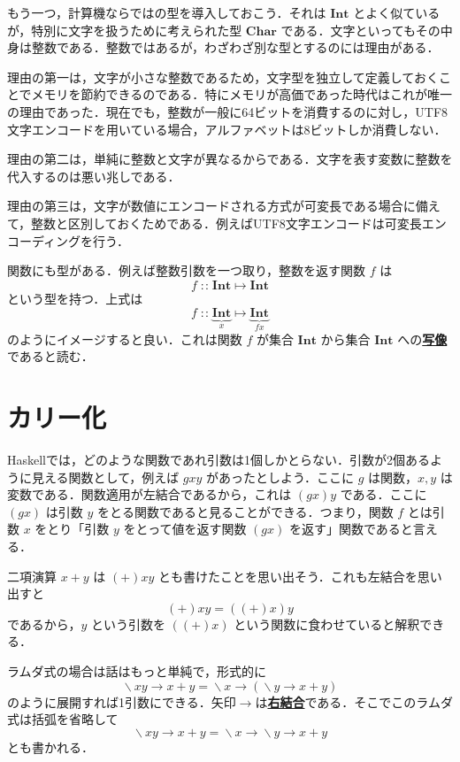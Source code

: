 \documentclass[a4paper,twocolumn]{jsbook}
\newcommand{\programminglanguage}[1]{\textsf{#1}}
\newcommand{\haskell}{\programminglanguage{Haskell}}
\newcommand{\keyword}[1]{{\underline{\textbf{#1}}}}
\DeclareMathOperator{\mIn}{{:\!:}}
\DeclareMathOperator{\mLambda}{\backslash}
\DeclareMathOperator{\mLambdaArrow}{\rightarrow}
\DeclareMathOperator{\mMapsTo}{\mapsto}
\newcommand{\mType}[1]{\mathbf{#1}}
\newcommand{\mCharType}{\mType{Char}}
\newcommand{\mIntType}{\mType{Int}}
\newcommand{\mLambdaExp}[2]{\mLambda{#1}\mLambdaArrow{#2}}
\newcommand{\mProj}[2]{#1\mMapsTo#2}
\begin{document}
もう一つ，計算機ならではの型を導入しておこう．それは $\mIntType$ とよく似ているが，特別に文字を扱うために考えられた型 $\mCharType$ である．文字といってもその中身は整数である．整数ではあるが，わざわざ別な型とするのには理由がある．

理由の第一は，文字が小さな整数であるため，文字型を独立して定義しておくことでメモリを節約できるのである．特にメモリが高価であった時代はこれが唯一の理由であった．現在でも，整数が一般に64ビットを消費するのに対し，UTF8文字エンコードを用いている場合，アルファベットは8ビットしか消費しない．

理由の第二は，単純に整数と文字が異なるからである．文字を表す変数に整数を代入するのは悪い兆しである．

理由の第三は，文字が数値にエンコードされる方式が可変長である場合に備えて，整数と区別しておくためである．例えばUTF8文字エンコードは可変長エンコーディングを行う．

関数にも型がある．例えば整数引数を一つ取り，整数を返す関数 $f$ は
\begin{equation}
f\mIn\mProj{\mIntType}{\mIntType}
\end{equation}
という型を持つ．上式は
\begin{equation}
f
\mIn\underbrace{\mIntType}_{x}
\mMapsTo
\underbrace{\mIntType}_{fx}
\end{equation}
のようにイメージすると良い．これは関数 $f$ が集合 $\mIntType$ から集合 $\mIntType$ への\keyword{写像}であると読む．

\section{カリー化}

\haskell では，どのような関数であれ引数は1個しかとらない．引数が2個あるように見える関数として，例えば $gxy$ があったとしよう．ここに $g$ は関数，$x,y$ は変数である．関数適用が左結合であるから，これは $\left(gx\right)y$ である．ここに $\left(gx\right)$ は引数 $y$ をとる関数であると見ることができる．つまり，関数 $f$ とは引数 $x$ をとり「引数 $y$ をとって値を返す関数 $\left(gx\right)$ を返す」関数であると言える．

二項演算 $x+y$ は $(+)xy$ とも書けたことを思い出そう．これも左結合を思い出すと
\begin{equation}
(+)xy=\left((+)x\right)y
\end{equation}
であるから，$y$ という引数を $\left((+)x\right)$ という関数に食わせていると解釈できる．

ラムダ式の場合は話はもっと単純で，形式的に
\begin{equation}
\mLambdaExp{xy}{x+y}
=\mLambdaExp{x}{\left(\mLambdaExp{y}{x+y}\right)}
\end{equation}
のように展開すれば1引数にできる．矢印$\mLambdaArrow$は\keyword{右結合}である．そこでこのラムダ式は括弧を省略して
\begin{equation}
\mLambdaExp{xy}{x+y}
=\mLambdaExp{x}{\mLambdaExp{y}{x+y}}
\end{equation}
とも書かれる．
\end{document}
